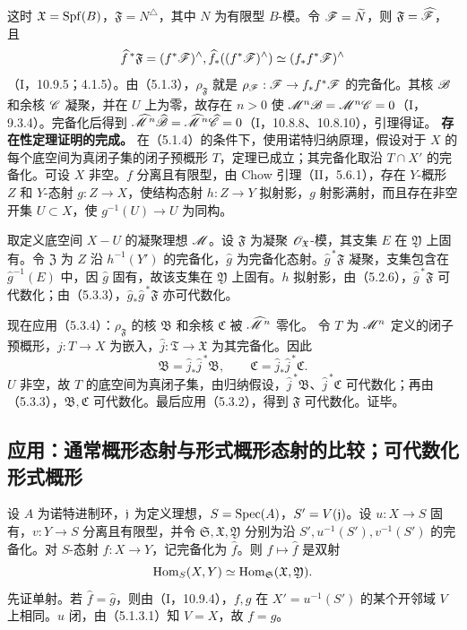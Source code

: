 这时 $\mathfrak X=\operatorname{Spf}(B)$，$\mathfrak F=N^\triangle$，其中 $N$ 为有限型 $B$-模。令 $\mathscr F=\widetilde{N}$，则 $\mathfrak F=\widehat{\mathscr F}$，且
\[
\widehat f^{\,*}\mathfrak F=(f^*\mathscr F)^\wedge,
 \widehat f_*((f^*\mathscr F)^\wedge)\simeq(f_*f^*\mathscr F)^\wedge
\]
（I，10.9.5；4.1.5）。由（5.1.3），$\rho_{\mathfrak F}$ 就是 $\rho_\mathscr F:\mathscr F\to f_*f^*\mathscr F$ 的完备化。其核 $\mathscr B$ 和余核 $\mathscr C$ 凝聚，并在 $U$ 上为零，故存在 $n>0$ 使 $\mathscr M^n\mathscr B=\mathscr M^n\mathscr C=0$（I，9.3.4）。完备化后得到 $\widehat{\mathscr M}^{\,n}\widehat{\mathscr B}=\widehat{\mathscr M}^{\,n}\widehat{\mathscr C}=0$（I，10.8.8、10.8.10），引理得证。\finishproof
{}
\textbf{存在性定理证明的完成。}
在（5.1.4）的条件下，使用诺特归纳原理，假设对于 $X$ 的每个底空间为真闭子集的闭子预概形 $T$，定理已成立；其完备化取沿 $T\cap X'$ 的完备化。可设 $X$ 非空。$f$ 分离且有限型，由 Chow 引理（II，5.6.1），存在 $Y$-概形 $Z$ 和 $Y$-态射 $g:Z\to X$，使结构态射 $h:Z\to Y$ 拟射影，$g$ 射影满射，而且存在非空开集 $U\subset X$，使 $g^{-1}(U)\to U$ 为同构。

取定义底空间 $X-U$ 的凝聚理想 $\mathscr M$。设 $\mathfrak F$ 为凝聚 $\mathscr O_{\mathfrak X}$-模，其支集 $E$ 在 $\mathfrak Y$ 上固有。令 $\mathfrak Z$ 为 $Z$ 沿 $h^{-1}(Y')$ 的完备化，$\widehat g$ 为完备化态射。$\widehat g^{\,*}\mathfrak F$ 凝聚，支集包含在 $\widehat g^{-1}(E)$ 中，因 $\widehat g$ 固有，故该支集在 $\mathfrak Y$ 上固有。$h$ 拟射影，由（5.2.6），$\widehat g^{\,*}\mathfrak F$ 可代数化；由（5.3.3），$\widehat g_*\widehat g^{\,*}\mathfrak F$ 亦可代数化。

现在应用（5.3.4）：$\rho_{\mathfrak F}$ 的核 $\mathfrak B$ 和余核 $\mathfrak C$ 被 $\widehat{\mathscr M}^{\,n}$ 零化。
令 $T$ 为 $\mathscr M^n$ 定义的闭子预概形，$j:T\to X$ 为嵌入，$\widehat j:\mathfrak T\to\mathfrak X$ 为其完备化。因此
\[
\mathfrak B=\widehat j_*\widehat j^{\,*}\mathfrak B,
\qquad \mathfrak C=\widehat j_*\widehat j^{\,*}\mathfrak C.
\]
$U$ 非空，故 $T$ 的底空间为真闭子集，由归纳假设，$\widehat j^{\,*}\mathfrak B$、$\widehat j^{\,*}\mathfrak C$ 可代数化；再由（5.3.3），$\mathfrak B,\mathfrak C$ 可代数化。最后应用（5.3.2），得到 $\mathfrak F$ 可代数化。证毕。

\subsection{应用：通常概形态射与形式概形态射的比较；可代数化形式概形}
设 $A$ 为诺特进制环，$\mathfrak j$ 为定义理想，$S=\operatorname{Spec}(A)$，$S'=V(\mathfrak j)$。设 $u:X\to S$ 固有，$v:Y\to S$ 分离且有限型，并令 $\mathfrak S,\mathfrak X,\mathfrak Y$ 分别为沿 $S',u^{-1}(S'),v^{-1}(S')$ 的完备化。对 $S$-态射 $f:X\to Y$，记完备化为 $\widehat f$。则 $f\mapsto\widehat f$ 是双射
\[
\operatorname{Hom}_S(X,Y)\simeq\operatorname{Hom}_{\mathfrak S}(\mathfrak X,\mathfrak Y).
\]
\eproof
先证单射。若 $\widehat f=\widehat g$，则由（I，10.9.4），$f,g$ 在 $X'=u^{-1}(S')$ 的某个开邻域 $V$ 上相同。$u$ 闭，由（5.1.3.1）知 $V=X$，故 $f=g$。

